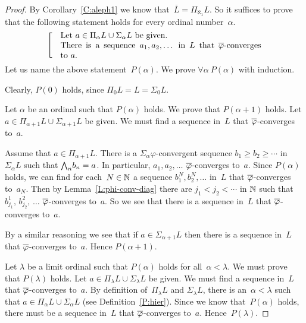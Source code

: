 \documentclass[main.tex]{subfiles}
\begin{document}
\begin{proof}
By Corollary~\ref{C:aleph1}
we know that~$\overline L = \Pi_{\aleph_1} L$.
So it suffices to prove that
the following statement holds for every ordinal number~$\alpha$.
\begin{equation*}
\left[\quad
\begin{minipage}{.7\columnwidth}
Let $a\in \Pi_\alpha L\cup \Sigma_\alpha L$ be given.\\
There is a sequence $a_1,a_2,\dotsc$ in~$L$
that $\ol\varphi$-converges to~$a$.
\end{minipage}
\right.
\end{equation*}
Let us name the above statement~$P(\alpha)$.
We prove $\forall\alpha\ P(\alpha)$ with induction.

Clearly, $P(0)$ holds,
since $\Pi_0 L = L = \Sigma_0 L$.

\vspace{.3em}
Let $\alpha$ be an ordinal  such that $P(\alpha)$ holds.
We prove that $P(\alpha+1)$ holds.
Let $a\in \Pi_{\alpha+1}L \cup \Sigma_{\alpha+1} L$ be given.
We must find a sequence in~$L$ that
$\overline\varphi$-converges to~$a$.

Assume that $a\in \Pi_{\alpha+1} L$.
There is a $\Sigma_\alpha\varphi$-convergent
sequence $b_1 \geq b_2 \geq \dotsb$ in $\Sigma_\alpha L$
such that $\textstyle{\bigwedge}_n b_n = a$.
In particular, $a_1,a_2,\dotsc$ $\overline\varphi$-converges to~$a$.
Since $P(\alpha)$ holds,
we can find for each~$N\in \mathbb{N}$ a
sequence $b^N_1, b^N_2,\dotsc$ in~$L$
that $\overline\varphi$-converges to~$a_N$.
Then by Lemma~\ref{L:phi-conv-diag}
there are $j_1 < j_2 < \dotsb$ in $\mathbb{N}$
such that $b^1_{j_1},\, b^2_{j_2},\,\dotsc$
$\overline\varphi$-converges to~$a$.
So we see that there is a sequence in~$L$
that $\overline\varphi$-converges to~$a$.

By a similar reasoning
we see that if $a\in \Sigma_{\alpha+1}L$
then there is a sequence in~$L$ 
that $\overline\varphi$-converges to~$a$.
Hence $P(\alpha+1)$.

\vspace{.3em}
Let $\lambda$ be a limit ordinal
such that $P(\alpha)$ holds
for all~$\alpha<\lambda$.
We must prove that $P(\lambda)$ holds.
Let $a\in \Pi_\lambda L\cup \Sigma_\lambda L$ be given.
We must find a sequence in~$L$ that $\overline\varphi$-converges to~$a$.
By definition of~$\Pi_\lambda L$ and $\Sigma_\lambda L$,
there is an~$\alpha<\lambda$
such that $a \in \Pi_\alpha L \cup \Sigma_\alpha L$
(see Definition~\ref{P:hier}).
Since we know that~$P(\alpha)$ holds,
there must be a sequence in~$L$ that $\overline\varphi$-converges to~$a$.
Hence~$P(\lambda)$.
\end{proof}
\end{document}

